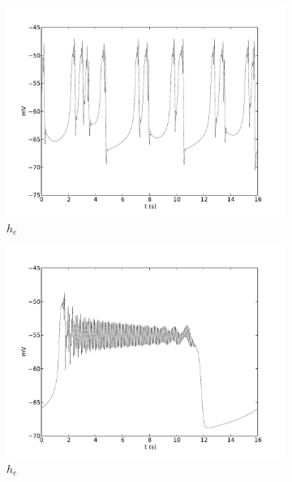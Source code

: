 \documentclass[a4paper,12pt]{article}
\begin{document}
\begin{figure}
\begin{subfigure}[b]{0.5\textwidth}
		\includegraphics[scale=0.35]{frontiers-2012-images-revised/effect_gamma_ee_yml-00143_ode-burst-thal-rev_yml-thal-rev-mod-0_9-0_5-1-save_yml-he-thal.pdf}
		\caption{$h_e$}
	\end{subfigure}
	\begin{subfigure}[b]{0.5\textwidth}
		\includegraphics[scale=0.35]{frontiers-2012-images-revised/effect_gamma_ee_yml-00143_ode-burst-thal-rev_yml-thal-rev-mod-1-0_7-1-save_yml-he-thal.pdf}
		\caption{$h_e$}
	\end{subfigure}
	\begin{subfigure}[b]{0.5\textwidth}

\end{subfigure}
\end{figure}
\end{document}

